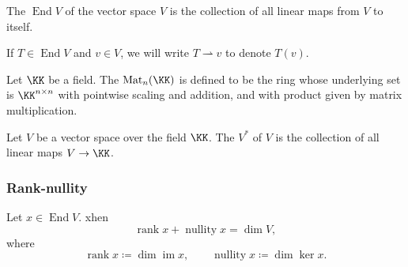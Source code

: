 \documentclass{article}
\DeclareMathOperator{\End}{End}
\DeclareMathOperator{\Mat}{Mat}
\DeclareMathOperator{\im}{im}
\DeclareMathOperator{\rank}{rank}
\DeclareMathOperator{\nullity}{nullity}
\begin{document}
\begin{definition}
    The  $\End V$ of the vector space $V$ is the collection of all linear maps from $V$ to itself.

    If $T \in \End V$ and $v \in V$, we will write $T \rightharpoonup v$ to denote $T(v)$.
\end{definition}

\begin{definition}
    Let $\KK$ be a field.
    The  $\Mat_n(\KK)$ is defined to be the ring whose underlying set is $\KK^{n \times n}$ with pointwise scaling and addition, and with product given by matrix multiplication.
\end{definition}

\begin{definition}
    Let $V$ be a vector space over the field $\KK$.
    The  $V^\ast$ of $V$ is the collection of all linear maps $V \to \KK$.
\end{definition}

\subsubsection{Rank-nullity}

\begin{theorem}
    \label{thm:RankNullity}
    Let $x \in \End V$.
    xhen
    \[
        \rank x + \nullity x
        =
        \dim V,
    \]
    where
    \[
        \rank x
        \coloneq
        \dim \im x
        ,\qquad
        \nullity x
        \coloneq
        \dim \ker x.
    \]
\end{theorem}
\end{document}
